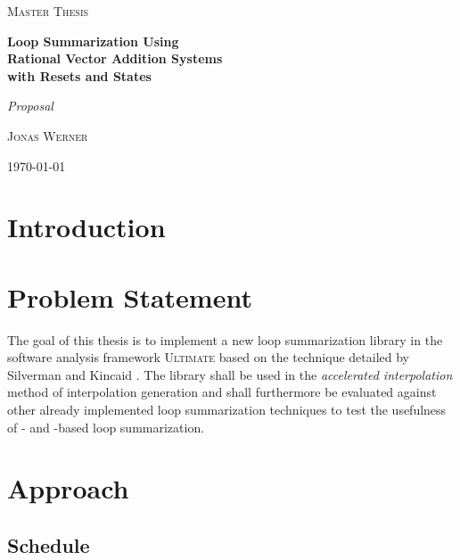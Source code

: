 \documentclass{article}
\begin{document}
\newcommand{\HorizontalLine}{\rule{\linewidth}{0.3mm}}

\begin{center}
	{\scshape\Large Master Thesis \par}
	\vspace{1.5cm}
	{\huge\bfseries Loop Summarization Using \\ Rational Vector Addition Systems \\ with Resets and States \par}
    {\huge \itshape Proposal \par}
	\vspace{1cm}
	{\large \scshape Jonas Werner\par}
	\vspace{0.5cm}
	{\today \vspace{2cm}}
\end{center}

\vspace*{2cm}

\section{Introduction}


\section{Problem Statement}
The goal of this thesis is to implement a new loop summarization library in the software analysis framework \textsc{Ultimate}\cite{Zitat02} based on the technique detailed by Silverman and Kincaid \cite{10.1007/978-3-030-25543-5_7}. The library shall be used in the \textsl{accelerated interpolation} method of interpolation generation and shall furthermore be evaluated against other already implemented loop summarization techniques to test the usefulness of \qvasr- and \qvasrs-based loop summarization.
\section{Approach}


\begin{landscape}
\section{Schedule}


\end{landscape}



\pagebreak
{}


\end{document}
